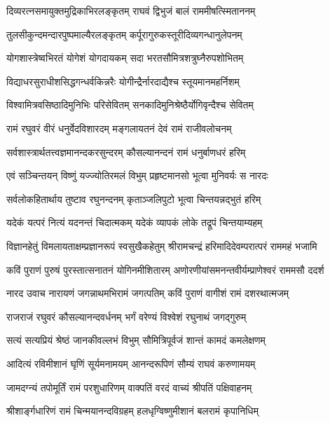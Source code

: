 \twolineshloka
{दिव्यरत्नसमायुक्तमुद्रिकाभिरलङ्कृतम्}
{राघवं द्विभुजं बालं राममीषत्स्मिताननम्}%

\twolineshloka
{तुलसीकुन्दमन्दारपुष्पमाल्यैरलङ्कृतम्}
{कर्पूरागुरुकस्तूरीदिव्यगन्धानुलेपनम्}%

\twolineshloka
{योगशास्त्रेष्वभिरतं योगेशं योगदायकम्}
{सदा भरतसौमित्रशत्रुघ्नैरुपशोभितम्}%

\twolineshloka
{विद्याधरसुराधीशसिद्धगन्धर्वकिन्नरैः}
{योगीन्द्रैर्नारदाद्यैश्च स्तूयमानमहर्निशम्}%

\twolineshloka
{विश्वामित्रवसिष्ठादिमुनिभिः परिसेवितम्}
{सनकादिमुनिश्रेष्ठैर्योगिवृन्दैश्च सेवितम्}%

\twolineshloka
{रामं रघुवरं वीरं धनुर्वेदविशारदम्}
{मङ्गलायतनं देवं रामं राजीवलोचनम्}%

\twolineshloka
{सर्वशास्त्रार्थतत्त्वज्ञमानन्दकरसुन्दरम्}
{कौसल्यानन्दनं रामं धनुर्बाणधरं हरिम्}%

\twolineshloka
{एवं सञ्चिन्तयन् विष्णुं यज्ज्योतिरमलं विभुम्}
{प्रहृष्टमानसो भूत्वा मुनिवर्यः स नारदः}%

\twolineshloka
{सर्वलोकहितार्थाय तुष्टाव रघुनन्दनम्}
{कृताञ्जलिपुटो भूत्वा चिन्तयन्नद्भुतं हरिम्}%

\twolineshloka
{यदेकं यत्परं नित्यं यदनन्तं चिदात्मकम्}
{यदेकं व्यापकं लोके तद्रूपं चिन्तयाम्यहम्}%

\fourlineindentedshloka
{विज्ञानहेतुं विमलायताक्षम्}{प्रज्ञानरूपं स्वसुखैकहेतुम्}
{श्रीरामचन्द्रं हरिमादिदेवम्}{परात्परं राममहं भजामि}%

\fourlineindentedshloka
{कविं पुराणं पुरुषं पुरस्तात्}{सनातनं योगिनमीशितारम्}
{अणोरणीयांसमनन्तवीर्यम्}{प्राणेश्वरं राममसौ ददर्श}%

नारद उवाच\nopagebreak[4]
\twolineshloka
{नारायणं जगन्नाथमभिरामं जगत्पतिम्}
{कविं पुराणं वागीशं रामं दशरथात्मजम्}%

\twolineshloka
{राजराजं रघुवरं कौसल्यानन्दवर्धनम्}
{भर्गं वरेण्यं विश्वेशं रघुनाथं जगद्गुरुम्}%

\twolineshloka
{सत्यं सत्यप्रियं श्रेष्ठं जानकीवल्लभं विभुम्}
{सौमित्रिपूर्वजं शान्तं कामदं कमलेक्षणम्}%

\twolineshloka
{आदित्यं रविमीशानं घृणिं सूर्यमनामयम्}
{आनन्दरूपिणं सौम्यं राघवं करुणामयम्}%

\twolineshloka
{जामदग्न्यं तपोमूर्तिं रामं परशुधारिणम्}
{वाक्पतिं वरदं वाच्यं श्रीपतिं पक्षिवाहनम्}%

\twolineshloka
{श्रीशार्ङ्गधारिणं रामं चिन्मयानन्दविग्रहम्}
{हलधृग्विष्णुमीशानं बलरामं कृपानिधिम्}%


